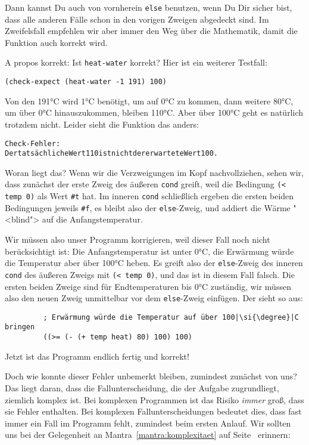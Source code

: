 Dann kannst Du auch von vornherein \lstinline{else} benutzen, wenn Du Dir
sicher bist, dass alle anderen Fälle schon in den vorigen Zweigen
abgedeckt sind.  Im Zweifelsfall empfehlen wir aber immer den Weg über
die Mathematik, damit die Funktion auch korrekt wird.

A propos korrekt: Ist \lstinline{heat-water} korrekt?  Hier ist ein
weiterer Testfall:
%
\begin{lstlisting}
(check-expect (heat-water -1 191) 100)
\end{lstlisting}
%
Von den 191\si{\degree}C wird 1\si{\degree}C benötigt, um auf 0\si{\degree}C zu kommen, dann weitere
80\si{\degree}C, um über 0\si{\degree}C hinauszukommen, bleiben 110\si{\degree}C.  Aber über 100\si{\degree}C geht
es natürlich trotzdem nicht.  Leider sieht die Funktion das anders:
%
\begin{alltt}
Check-Fehler:
	Der tatsächliche Wert 110 ist nicht der erwartete Wert 100.
\end{alltt}
%
Woran liegt das?  Wenn wir die Verzweigungen im Kopf nachvollziehen,
sehen wir, dass zunächst der erste Zweig des äußeren \lstinline{cond}
greift, weil die Bedingung \lstinline{(< temp 0)} als Wert \lstinline{#t} hat.
Im inneren \lstinline{cond} schließlich ergeben die ersten beiden
Bedingungen jeweils \lstinline{#f}, es bleibt also der \lstinline{else}-Zweig,
und addiert die Wärme "<blind"> auf die Anfangstemperatur.

Wir müssen also unser Programm korrigieren, weil dieser Fall noch
nicht berücksichtigt ist: Die Anfangstemperatur ist unter 0\si{\degree}C, die
Erwärmung würde die Temperatur aber über 100\si{\degree}C heben.  Es greift also
der \lstinline{else}-Zweig des inneren \lstinline{cond} des äußeren Zweigs
mit \lstinline{(< temp 0)}, und das ist in diesem Fall falsch.  Die
ersten beiden Zweige sind für Endtemperaturen bis 0\si{\degree}C zuständig, wir
müssen also den neuen Zweig unmittelbar vor dem \lstinline{else}-Zweig
einfügen.  Der sieht so aus:
%
\begin{lstlisting}
         ; Erwärmung würde die Temperatur auf über 100|\si{\degree}|C bringen
         ((>= (- (+ temp heat) 80) 100) 100)
\end{lstlisting}
%
Jetzt ist das Programm endlich fertig und korrekt!

Doch wie konnte dieser Fehler unbemerkt bleiben, zumindest zunächst
von uns?  Das liegt daran, dass die Fallunterscheidung, die der
Aufgabe zugrundliegt, ziemlich komplex ist.  Bei komplexen Programmen
ist das Risiko \emph{immer} groß, dass sie Fehler enthalten.  Bei
komplexen Fallunterscheidungen bedeutet dies, dass fast immer ein Fall
im Programm fehlt, zumindest beim ersten Anlauf.  Wir sollten uns bei
der Gelegenheit an Mantra~\ref{mantra:komplexitaet} auf
Seite~\pageref{mantra:komplexitaet} erinnern:

